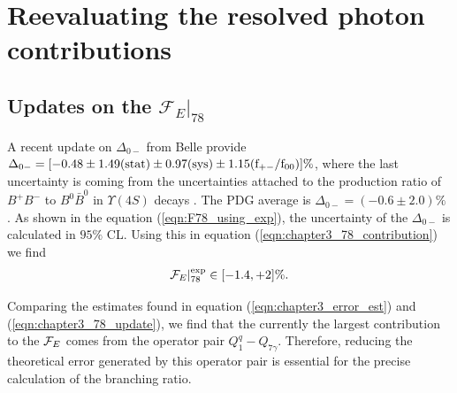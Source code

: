 \section{Reevaluating the resolved photon contributions}\label{sec:reeval_resolved_photon_cont}

\subsection{Updates on the $\mathcal{F}_{E}|_{78}$}
A recent update on $\Delta_{0-}$ from Belle \cite{Watanuki:2018xxg} provide $\Delta_{0-}=[-0.48\pm 1.49(\rm{stat})\pm 0.97(\rm{sys})\pm1.15(f_{+-}/f_{00})]\%$, where the last uncertainty is coming from the uncertainties attached to the production ratio of $B^+B^-$ to $B^0\bar{B}^0$ in $\Upsilon(4S)$ decays \cite{Gunawardana:2019gep}. The PDG average is $\Delta_{0-}=(-0.6\pm 2.0)\%$ \cite{Aubert:2005cua, Watanuki:2018xxg, Aubert:2007my}. As shown in the equation (\ref{eqn:F78_using_exp}), the uncertainty of the $\Delta_{0-}$ is calculated in $95\%$ CL. Using this in equation (\ref{eqn:chapter3_78_contribution}) we find
\vspace*{-0.6cm}
\begin{eqnarray}\label{eqn:chapter3_78_update}
\mathcal{F}_{E}|_{78} ^{\mathrm{exp}}\in [-1.4,+2] \%.
\vspace*{-0.5cm}
\end{eqnarray}

Comparing the estimates found in equation (\ref{eqn:chapter3_error_est}) and (\ref{eqn:chapter3_78_update}), we find that the currently the largest contribution to the ${\cal F} _E$ comes from the operator pair $Q_{1}^{q}-Q_{7\gamma}$. Therefore, reducing the theoretical error generated by this operator pair is essential for the precise calculation of the branching ratio.